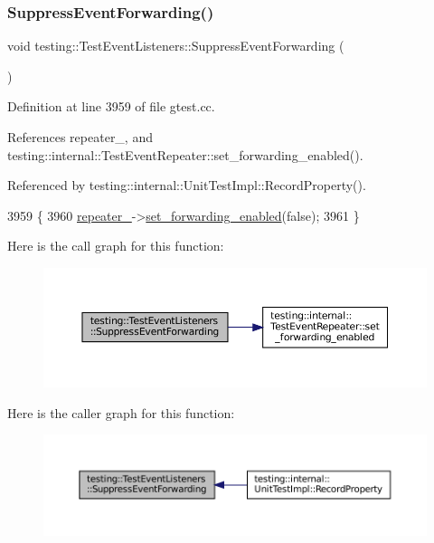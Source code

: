 \subsubsection{\texorpdfstring{Suppress\+Event\+Forwarding()}{SuppressEventForwarding()}}
{\footnotesize\ttfamily void testing\+::\+Test\+Event\+Listeners\+::\+Suppress\+Event\+Forwarding (\begin{DoxyParamCaption}{ }\end{DoxyParamCaption})\hspace{0.3cm}{\ttfamily [private]}}



Definition at line 3959 of file gtest.\+cc.



References repeater\+\_\+, and testing\+::internal\+::\+Test\+Event\+Repeater\+::set\+\_\+forwarding\+\_\+enabled().



Referenced by testing\+::internal\+::\+Unit\+Test\+Impl\+::\+Record\+Property().


\begin{DoxyCode}
3959                                                  \{
3960   \hyperlink{classtesting_1_1TestEventListeners_a625d58b951893e80cde12862aece6fd8}{repeater\_}->\hyperlink{classtesting_1_1internal_1_1TestEventRepeater_a86c52e311b70598a385a0589277e92e0}{set\_forwarding\_enabled}(\textcolor{keyword}{false});
3961 \}
\end{DoxyCode}
Here is the call graph for this function\+:
\nopagebreak
\begin{figure}[H]
\begin{center}
\leavevmode
\includegraphics[width=350pt]{classtesting_1_1TestEventListeners_a7132550dc1c50bb3399a6d6d3fc9be3d_cgraph}
\end{center}
\end{figure}
Here is the caller graph for this function\+:
\nopagebreak
\begin{figure}[H]
\begin{center}
\leavevmode
\includegraphics[width=350pt]{classtesting_1_1TestEventListeners_a7132550dc1c50bb3399a6d6d3fc9be3d_icgraph}
\end{center}
\end{figure}


